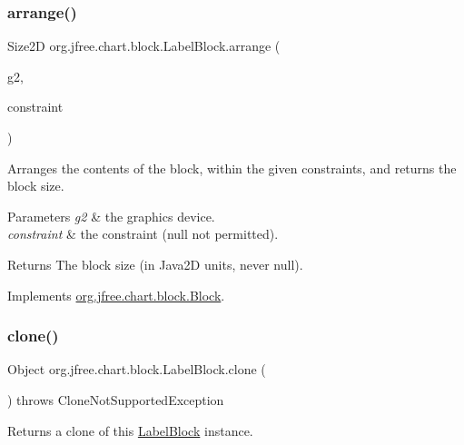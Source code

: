 \subsubsection{\texorpdfstring{arrange()}{arrange()}}
{\footnotesize\ttfamily Size2D org.\+jfree.\+chart.\+block.\+Label\+Block.\+arrange (\begin{DoxyParamCaption}\item[{Graphics2D}]{g2,  }\item[{\mbox{\hyperlink{classorg_1_1jfree_1_1chart_1_1block_1_1_rectangle_constraint}{Rectangle\+Constraint}}}]{constraint }\end{DoxyParamCaption})}

Arranges the contents of the block, within the given constraints, and returns the block size.


\begin{DoxyParams}{Parameters}
{\em g2} & the graphics device. \\
\hline
{\em constraint} & the constraint ({\ttfamily null} not permitted).\\
\hline
\end{DoxyParams}
\begin{DoxyReturn}{Returns}
The block size (in Java2D units, never {\ttfamily null}). 
\end{DoxyReturn}


Implements \mbox{\hyperlink{interfaceorg_1_1jfree_1_1chart_1_1block_1_1_block_ab4cabbc237c5277a4a0018bab930e5fe}{org.\+jfree.\+chart.\+block.\+Block}}.

\mbox{\label{classorg_1_1jfree_1_1chart_1_1block_1_1_label_block_ada9be5a99202926ce7f9e3d033c98d2e}} 
\subsubsection{\texorpdfstring{clone()}{clone()}}
{\footnotesize\ttfamily Object org.\+jfree.\+chart.\+block.\+Label\+Block.\+clone (\begin{DoxyParamCaption}{ }\end{DoxyParamCaption}) throws Clone\+Not\+Supported\+Exception}

Returns a clone of this {\ttfamily \mbox{\hyperlink{classorg_1_1jfree_1_1chart_1_1block_1_1_label_block}{Label\+Block}}} instance.

